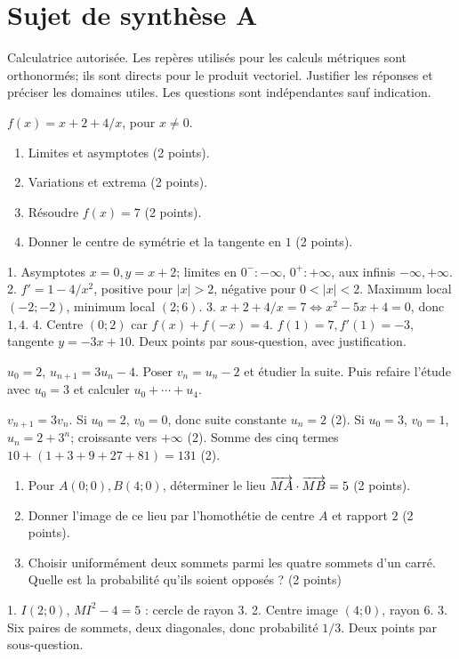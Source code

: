 \begingroup
\chapter*{Sujet de synthèse A}
\renewcommand{\thebmtexo}{SYN1.\arabic{bmtexo}}
\renewcommand{\theHbmtexo}{SYN1.\arabic{bmtexo}}
\setcounter{bmtexo}{0}
\begin{devoir}[3 h — 20 points]
Calculatrice autorisée. Les repères utilisés pour les calculs métriques sont orthonormés; ils sont directs pour le produit vectoriel. Justifier les réponses et préciser les domaines utiles. Les questions sont indépendantes sauf indication. 
\end{devoir}
\label{t11s-syn1-e01}
$f(x)=x+2+4/x$, pour $x\ne0$.
\begin{enumerate}\item Limites et asymptotes (2 points).
\item Variations et extrema (2 points).
\item Résoudre $f(x)=7$ (2 points).
\item Donner le centre de symétrie et la tangente en $1$ (2 points).\end{enumerate}
\begin{corrige}\label{sol-t11s-syn1-e01}
1. Asymptotes $x=0,y=x+2$; limites en $0^-:-\infty$, $0^+:+\infty$, aux infinis $-\infty,+\infty$.
2. $f'=1-4/x^2$, positive pour $|x|>2$, négative pour $0<|x|<2$. Maximum local $(-2;-2)$, minimum local $(2;6)$.
3. $x+2+4/x=7\Leftrightarrow x^2-5x+4=0$, donc $1,4$.
4. Centre $(0;2)$ car $f(x)+f(-x)=4$. $f(1)=7,f'(1)=-3$, tangente $y=-3x+10$. Deux points par sous-question, avec justification.
\end{corrige}
\exo[Suites]\label{t11s-syn1-e02}
$u_0=2$, $u_{n+1}=3u_n-4$. Poser $v_n=u_n-2$ et étudier la suite. Puis refaire l’étude avec $u_0=3$ et calculer $u_0+\cdots+u_4$.
\begin{corrige}\label{sol-t11s-syn1-e02}
$v_{n+1}=3v_n$. Si $u_0=2$, $v_0=0$, donc suite constante $u_n=2$ (2). Si $u_0=3$, $v_0=1$, $u_n=2+3^n$; croissante vers $+\infty$ (2). Somme des cinq termes $10+(1+3+9+27+81)=131$ (2).
\end{corrige}
\label{t11s-syn1-e03}
\begin{enumerate}\item Pour $A(0;0),B(4;0)$, déterminer le lieu $\overrightarrow{MA}\cdot\overrightarrow{MB}=5$ (2 points).
\item Donner l’image de ce lieu par l’homothétie de centre $A$ et rapport $2$ (2 points).
\item Choisir uniformément deux sommets parmi les quatre sommets d’un carré. Quelle est la probabilité qu’ils soient opposés ? (2 points)\end{enumerate}
\begin{corrige}\label{sol-t11s-syn1-e03}
1. $I(2;0)$, $MI^2-4=5$ : cercle de rayon $3$.
2. Centre image $(4;0)$, rayon $6$.
3. Six paires de sommets, deux diagonales, donc probabilité $1/3$. Deux points par sous-question.
\end{corrige}
\endgroup
